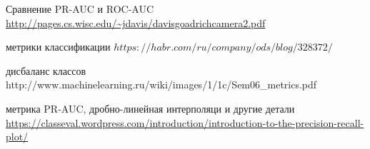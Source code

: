 \begin{thebibliography}{9}
Сравнение PR-AUC и ROC-AUC
\url{http://pages.cs.wisc.edu/~jdavis/davisgoadrichcamera2.pdf}

метрики классификации
$https://habr.com/ru/company/ods/blog/328372/$

дисбаланс классов
http://www.machinelearning.ru/wiki/images/1/1c/Sem06_metrics.pdf

метрика PR-AUC, дробно-линейная интерполяци и другие детали
\url{https://classeval.wordpress.com/introduction/introduction-to-the-precision-recall-plot/}

\end{thebibliography}
